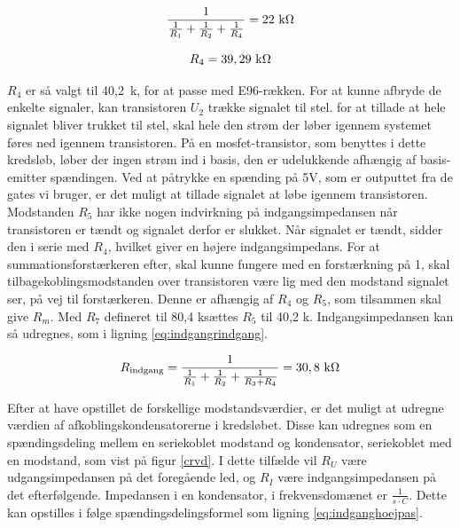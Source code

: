\begin{equation}
\label{eq:indgangr4udregning}
\frac{1}{\frac{1}{R_1}+\frac{1}{R_2}+\frac{1}{R_4}}=22~\mathrm{k}\ohm
\end{equation}

\begin{equation}
\label{eq:indgangr4}
R_4=39,29~\mathrm{k}\ohm
\end{equation}

$R_4$ er så valgt til 40,2~k\ohm, for at passe med E96-rækken.
For at kunne afbryde de enkelte signaler, kan transistoren $U_2$ trække signalet til stel. for at tillade at hele signalet bliver trukket til stel, skal hele den strøm der løber igennem systemet føres ned igennem transistoren. På en mosfet-transistor, som benyttes i dette kredsløb, løber der ingen strøm ind i basis, den er udelukkende afhængig af basis-emitter spændingen. Ved at påtrykke en spænding på 5V, som er outputtet fra de gates vi bruger, er det muligt at tillade signalet at løbe igennem transistoren.
Modstanden $R_5$ har ikke nogen indvirkning på indgangsimpedansen når transistoren er tændt og signalet derfor er slukket. Når signalet er tændt, sidder den i serie med $R_4$, hvilket giver en højere indgangsimpedans. For at summationsforstærkeren efter, skal kunne fungere med en forstærkning på 1, skal tilbagekoblingsmodstanden over transistoren være lig med den modstand signalet ser, på vej til forstærkeren. Denne er afhængig af $R_4$ og $R_5$, som tilsammen skal give $R_m$. Med $R_7$ defineret til 80,4 k\ohm sættes $R_5$ til 40,2 k\ohm . Indgangsimpedansen kan så udregnes, som i ligning \ref{eq:indgangrindgang}.


\begin{equation}
\label{eq:indgangrindgang}
R_{\mathrm{indgang}}=\frac{1}{\frac{1}{R_1}+\frac{1}{R_2}+\frac{1}{R_3+R_4}}=30,8~\mathrm{k}\ohm
\end{equation}

Efter at have opstillet de forskellige modstandsværdier, er det muligt at udregne værdien af afkoblingskondensatorerne i kredsløbet. Disse kan udregnes som en spændingsdeling mellem en seriekoblet modstand og kondensator, seriekoblet med en modstand, som vist på figur \ref{crvd}. I dette tilfælde vil $R_U$ være udgangsimpedansen på det foregående led, og $R_I$ være indgangsimpedansen på det efterfølgende. Impedansen i en kondensator, i frekvensdomænet er $\frac{1}{s\cdot C}$. Dette kan opstilles i følge spændingsdelingsformel som ligning \ref{eq:indganghoejpas}.

